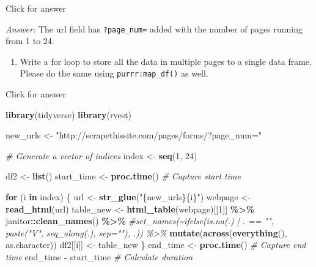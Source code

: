 \documentclass[
]{book}
\newenvironment{Shaded}{\begin{snugshade}}{\end{snugshade}}
\newcommand{\CommentTok}[1]{\textcolor[rgb]{0.56,0.35,0.01}{\textit{#1}}}
\newcommand{\ControlFlowTok}[1]{\textcolor[rgb]{0.13,0.29,0.53}{\textbf{#1}}}
\newcommand{\DecValTok}[1]{\textcolor[rgb]{0.00,0.00,0.81}{#1}}
\newcommand{\FunctionTok}[1]{\textcolor[rgb]{0.13,0.29,0.53}{\textbf{#1}}}
\newcommand{\NormalTok}[1]{#1}
\newcommand{\OtherTok}[1]{\textcolor[rgb]{0.56,0.35,0.01}{#1}}
\newcommand{\SpecialCharTok}[1]{\textcolor[rgb]{0.81,0.36,0.00}{\textbf{#1}}}
\newcommand{\StringTok}[1]{\textcolor[rgb]{0.31,0.60,0.02}{#1}}
\providecommand{\tightlist}{%
  \setlength{\itemsep}{0pt}\setlength{\parskip}{0pt}}
\begin{document}
Click for answer

\emph{Answer:} The url field has \texttt{?page\_num=} added with the number of pages running from 1 to 24.

\begin{enumerate}
\def\labelenumi{\arabic{enumi}.}
\setcounter{enumi}{2}
\tightlist
\item
  Write a for loop to store all the data in multiple pages to a single data frame. Please do the same using \texttt{purrr:map\_df()} as well.
\end{enumerate}

Click for answer

\begin{Shaded}
\begin{Highlighting}[]
\FunctionTok{library}\NormalTok{(tidyverse)}
\FunctionTok{library}\NormalTok{(rvest)}

\NormalTok{new\_urls }\OtherTok{\textless{}{-}} \StringTok{"http://scrapethissite.com/pages/forms/?page\_num="}

\CommentTok{\# Generate a vector of indices}
\NormalTok{index }\OtherTok{\textless{}{-}} \FunctionTok{seq}\NormalTok{(}\DecValTok{1}\NormalTok{, }\DecValTok{24}\NormalTok{)}
\end{Highlighting}
\end{Shaded}

\begin{Shaded}
\begin{Highlighting}[]
\NormalTok{df2 }\OtherTok{\textless{}{-}} \FunctionTok{list}\NormalTok{()}
\NormalTok{start\_time }\OtherTok{\textless{}{-}} \FunctionTok{proc.time}\NormalTok{() }\CommentTok{\# Capture start time}

\ControlFlowTok{for}\NormalTok{ (i }\ControlFlowTok{in}\NormalTok{ index) \{}
\NormalTok{  url }\OtherTok{\textless{}{-}} \FunctionTok{str\_glue}\NormalTok{(}\StringTok{"\{new\_urls\}\{i\}"}\NormalTok{)}
\NormalTok{  webpage }\OtherTok{\textless{}{-}} \FunctionTok{read\_html}\NormalTok{(url)}
\NormalTok{  table\_new }\OtherTok{\textless{}{-}} \FunctionTok{html\_table}\NormalTok{(webpage)[[}\DecValTok{1}\NormalTok{]] }\SpecialCharTok{\%\textgreater{}\%}
\NormalTok{    janitor}\SpecialCharTok{::}\FunctionTok{clean\_names}\NormalTok{() }\SpecialCharTok{\%\textgreater{}\%}
    \CommentTok{\#set\_names(\textasciitilde{}ifelse(is.na(.) | . == "", paste("V", seq\_along(.), sep=""), .)) \%\textgreater{}\%}
    \FunctionTok{mutate}\NormalTok{(}\FunctionTok{across}\NormalTok{(}\FunctionTok{everything}\NormalTok{(), as.character))}
\NormalTok{  df2[[i]] }\OtherTok{\textless{}{-}}\NormalTok{ table\_new}
\NormalTok{\}}
\NormalTok{end\_time }\OtherTok{\textless{}{-}} \FunctionTok{proc.time}\NormalTok{() }\CommentTok{\# Capture end time}
\NormalTok{end\_time }\SpecialCharTok{{-}}\NormalTok{ start\_time }\CommentTok{\# Calculate duration}
\end{Highlighting}
\end{Shaded}
\end{document}
